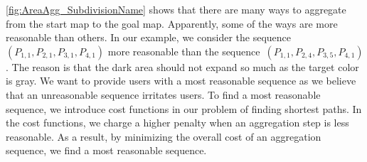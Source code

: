 \fig\ref{fig:AreaAgg_SubdivisionName} shows that there are many 
ways to aggregate from the start map to the goal map.
Apparently, some of the ways are more reasonable than 
others.
In our example, we consider 
the sequence~$(P_{1,1}, P_{2,1},P_{3,1},P_{4,1})$ 
more reasonable than 
the sequence~$(P_{1,1}, P_{2,4},P_{3,5},P_{4,1})$.
The reason is that the dark area should not expand so much
as the target color is gray.
We want to provide users with a most reasonable sequence as we 
believe that an unreasonable sequence irritates users.
To find a most reasonable sequence, we introduce cost functions 
in our problem of finding shortest paths.
In the cost functions, we charge a higher penalty 
when an aggregation step is less reasonable.
As a result, by minimizing the overall cost of an aggregation 
sequence, we find a most reasonable sequence.

